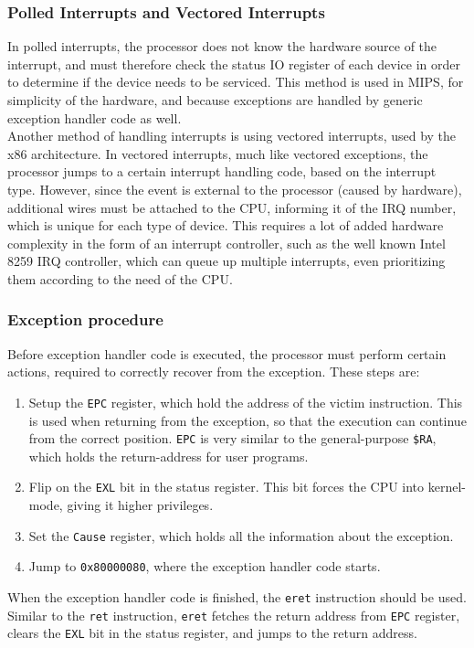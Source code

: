 \subsubsection{Polled Interrupts and Vectored Interrupts}
In polled interrupts, the processor does not know the hardware source of the
interrupt, and must therefore check the status IO register of each device in
order to determine if the device needs to be serviced\cite{cs_pitt:exceptions}.
This method is used in MIPS, for simplicity of the hardware, and because exceptions
are handled by generic exception handler code as well.\\
Another method of handling interrupts is using vectored interrupts, used by
the x86 architecture. In vectored interrupts, much like vectored exceptions, the
processor jumps to a certain interrupt handling code, based on the interrupt type.
However, since the event is external to the processor (caused by hardware),
additional wires must be attached to the CPU, informing it of the IRQ number,
which is unique for each type of device\cite{osdev:interrupts}. This requires
a lot of added hardware complexity in the form of an interrupt controller,
such as the well known Intel 8259 IRQ controller, which can queue up
multiple interrupts, even prioritizing them according to the need of the CPU\cite{osdev:interrupts}.

\subsubsection{Exception procedure}
\label{sec:exception_procedure}
Before exception handler code is executed, the processor must perform certain
actions, required to correctly recover from the exception. These steps are\cite{see_mips_run}:
\begin{enumerate}
\item Setup the \texttt{EPC} register, which hold the address of the victim
instruction. This is used when returning from the exception, so that the
execution can continue from the correct position. \texttt{EPC} is very similar to the
general-purpose \texttt{\$RA}, which holds the return-address for user
programs.
\item Flip on the \texttt{EXL} bit in the status register. This bit forces the
CPU into kernel-mode, giving it higher privileges.
\item Set the \texttt{Cause} register, which holds all the information about
the exception.
\item Jump to \texttt{0x80000080}, where the exception handler code starts.
\end{enumerate}
When the exception handler code is finished, the \texttt{eret} instruction should
be used. Similar to the \texttt{ret} instruction, \texttt{eret} fetches the return
address from \texttt{EPC} register, clears the \texttt{EXL} bit in the status
register, and jumps to the return address.


